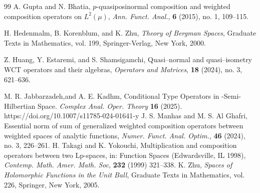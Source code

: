\documentclass{amsart}
\theoremstyle{definition}\newtheorem{defn}[thm]{Definition}
\theoremstyle{remark}
\numberwithin{equation}{section}
\begin{document}
\begin{thebibliography}{99}
A. Gupta and N. Bhatia,
\newblock \(p\)-quasiposinormal composition and weighted composition operators on \(L^2(\mu)\),
\newblock \textit{Ann. Funct. Anal.}, \textbf{6} (2015), no. 1, 109--115.

H. Hedenmalm, B. Korenblum, and K. Zhu,
\newblock \textit{Theory of Bergman Spaces},
\newblock Graduate Texts in Mathematics, vol. 199, Springer-Verlag, New York, 2000.

Z. Huang, Y. Estaremi, and S. Shamsigamchi,
\newblock Quasi–normal and quasi–isometry WCT operators and their algebras,
\newblock \textit{Operators and Matrices}, \textbf{18} (2024), no. 3, 621--636.

 M. R. Jabbarzadeh,and A. E. Kadhm, 
\newblock Conditional Type Operators in 
-Semi-Hilbertian Space.
\newblock \textit{Complex Anal. Oper. Theory} {\bf16} (2025). https://doi.org/10.1007/s11785-024-01641-y
J. S. Manhas and M. S. Al Ghafri,
\newblock Essential norm of sum of generalized weighted composition operators between weighted spaces of analytic functions,
\newblock \textit{Numer. Funct. Anal. Optim.}, \textbf{46} (2024), no. 3, 226--261.
 H. Takagi and K. Yokouchi,
\newblock Multiplication and composition operators between two Lp-spaces, in: Function Spaces (Edwardsville, IL 1998), 
\newblock \textit{Contemp. Math. Amer. Math. Soc}, {\bf 232} (1999) 321–338.
K. Zhu,
\newblock \textit{Spaces of Holomorphic Functions in the Unit Ball},
\newblock Graduate Texts in Mathematics, vol. 226, Springer, New York, 2005.


\end{thebibliography}
\end{document}
